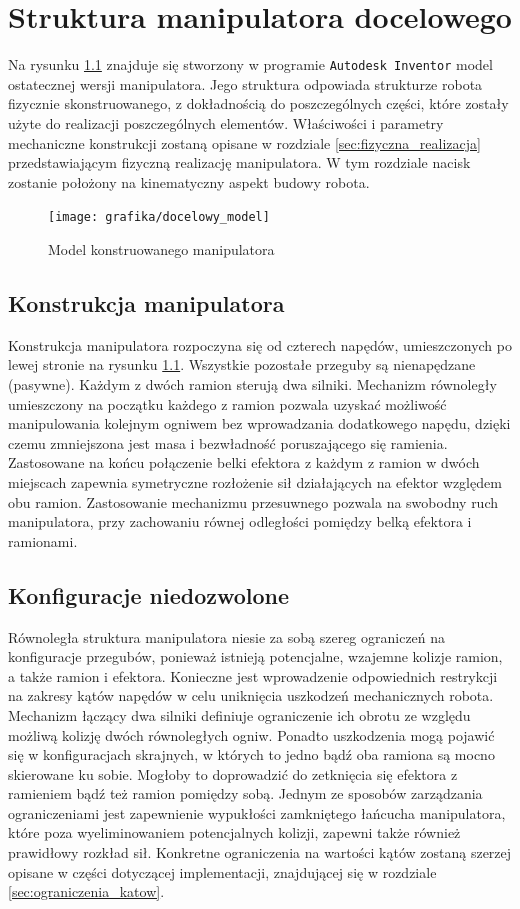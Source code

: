 \documentclass[printmode]{mgr}
\begin{document}
\chapter{Struktura manipulatora docelowego}
Na rysunku \ref{rys:docelowy_model} znajduje się stworzony w programie \texttt{Autodesk Inventor} model
ostatecznej wersji manipulatora. Jego struktura odpowiada strukturze robota fizycznie skonstruowanego, z dokładnością
do poszczególnych części, które zostały użyte do realizacji poszczególnych elementów. Właściwości i parametry mechaniczne
konstrukcji zostaną opisane w rozdziale \ref{sec:fizyczna_realizacja} przedstawiającym fizyczną realizację manipulatora.
W tym rozdziale nacisk zostanie położony na kinematyczny aspekt budowy robota.
\begin{figure}[tp]
\centering
  \texttt{[image: grafika/docelowy\_model]}
  \caption{Model konstruowanego manipulatora}
  \label{rys:docelowy_model}  
\end{figure}

\section{Konstrukcja manipulatora}
Konstrukcja manipulatora rozpoczyna się od czterech napędów, umieszczonych po lewej stronie na rysunku \ref{rys:docelowy_model}.
Wszystkie pozostałe przeguby są nienapędzane (pasywne). Każdym z dwóch ramion sterują dwa silniki. 
Mechanizm równoległy umieszczony na początku każdego z ramion
pozwala uzyskać możliwość manipulowania kolejnym ogniwem bez wprowadzania dodatkowego napędu, dzięki czemu
zmniejszona jest masa i bezwładność poruszającego się ramienia.
Zastosowane na końcu połączenie belki efektora z każdym z ramion w dwóch miejscach zapewnia symetryczne rozłożenie
sił działających na efektor względem obu ramion. Zastosowanie mechanizmu przesuwnego pozwala
na swobodny ruch manipulatora, przy zachowaniu równej odległości pomiędzy belką efektora i ramionami.

\section{Konfiguracje niedozwolone}\label{sec:konfiguracje_niedozwolone}
Równoległa struktura manipulatora niesie za sobą szereg ograniczeń na konfiguracje przegubów, ponieważ
istnieją potencjalne, wzajemne kolizje ramion, a także ramion i efektora. Konieczne jest wprowadzenie odpowiednich restrykcji
na zakresy kątów napędów w celu uniknięcia uszkodzeń mechanicznych robota. Mechanizm
łączący dwa silniki definiuje ograniczenie ich obrotu ze względu możliwą kolizję dwóch równoległych ogniw. 
Ponadto uszkodzenia mogą pojawić się w konfiguracjach skrajnych, w których to jedno bądź oba ramiona są mocno
skierowane ku sobie. Mogłoby to doprowadzić do zetknięcia się efektora z ramieniem bądź też ramion pomiędzy sobą.
Jednym ze sposobów zarządzania ograniczeniami jest zapewnienie wypukłości zamkniętego łańcucha manipulatora, 
które poza wyeliminowaniem potencjalnych kolizji, zapewni także również prawidłowy rozkład sił.
Konkretne ograniczenia na wartości kątów zostaną szerzej opisane w części dotyczącej implementacji, 
znajdującej się w rozdziale \ref{sec:ograniczenia_katow}.
\end{document}
